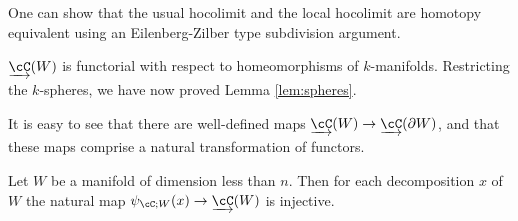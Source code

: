 One can show that the usual hocolimit and the local hocolimit are homotopy equivalent using an 
Eilenberg-Zilber type subdivision argument.

\medskip

$\cl{\cC}(W)$ is functorial with respect to homeomorphisms of $k$-manifolds. 
Restricting the $k$-spheres, we have now proved Lemma \ref{lem:spheres}.

It is easy to see that
there are well-defined maps $\cl{\cC}(W)\to\cl{\cC}(\bd W)$, and that these maps
comprise a natural transformation of functors.






\begin{lem}
\label{lem:colim-injective}
Let $W$ be a manifold of dimension less than $n$.  Then for each
decomposition $x$ of $W$ the natural map $\psi_{\cC;W}(x)\to \cl{\cC}(W)$ is injective.
\end{lem}
